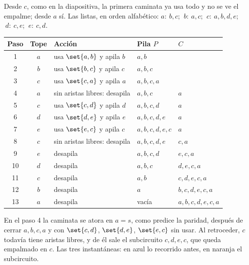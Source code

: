 \documentclass[11pt,letterpaper]{article}
\begin{document}
\begin{ejemplo}
  \label{ej:hierholzer-traza}
  Desde $c$, como en la diapositiva, la primera caminata ya usa todo y
  no se ve el empalme; desde $a$ sí. Las listas, en orden alfabético:
  $a{:}\ b, c$; $\ b{:}\ a, c$; $\ c{:}\ a, b, d, e$; $\ d{:}\ c, e$;
  $\ e{:}\ c, d$.
  \begin{center}
  \small
  \begin{tabular}{cclll}
    \toprule
    \textbf{Paso} & \textbf{Tope} & \textbf{Acción} & \textbf{Pila $P$}
      & \textbf{$C$} \\
    \midrule
    1 & $a$ & usa $\set{a,b}$ y apila $b$ & $a, b$ & \\
    2 & $b$ & usa $\set{b,c}$ y apila $c$ & $a, b, c$ & \\
    3 & $c$ & usa $\set{c,a}$ y apila $a$ & $a, b, c, a$ & \\
    4 & $a$ & sin aristas libres: desapila & $a, b, c$ & $a$ \\
    5 & $c$ & usa $\set{c,d}$ y apila $d$ & $a, b, c, d$ & $a$ \\
    6 & $d$ & usa $\set{d,e}$ y apila $e$ & $a, b, c, d, e$ & $a$ \\
    7 & $e$ & usa $\set{e,c}$ y apila $c$ & $a, b, c, d, e, c$ & $a$ \\
    8 & $c$ & sin aristas libres: desapila & $a, b, c, d, e$ & $c, a$ \\
    9 & $e$ & desapila & $a, b, c, d$ & $e, c, a$ \\
    10 & $d$ & desapila & $a, b, c$ & $d, e, c, a$ \\
    11 & $c$ & desapila & $a, b$ & $c, d, e, c, a$ \\
    12 & $b$ & desapila & $a$ & $b, c, d, e, c, a$ \\
    13 & $a$ & desapila & vacía & $a, b, c, d, e, c, a$ \\
    \bottomrule
  \end{tabular}
  \end{center}
  En el paso 4 la caminata se atora en $a = s$, como predice la
  paridad, después de cerrar $a, b, c, a$ y con $\set{c,d}$,
  $\set{d,e}$, $\set{e,c}$ sin usar. Al retroceder, $c$ todavía tiene
  aristas libres, y de él sale el subcircuito $c, d, e, c$, que queda
  empalmado en $c$. Las tres instantáneas: en azul lo recorrido antes,
  en naranja el subcircuito.
  \begin{center}
\end{center}
\end{ejemplo}
\end{document}
